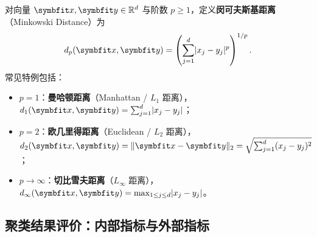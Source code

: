 \begin{definition}[闵可夫斯基距离及其常见特例]\label{def:minkowski-distance}
对向量 $\bm{x}, \bm{y}\in\R^d$ 与阶数 $p \ge 1$，定义\textbf{闵可夫斯基距离}（Minkowski Distance）为
\begin{equation}\label{eq:minkowski}
  d_p(\bm{x}, \bm{y}) = \left(\sum_{j=1}^{d}\abs{x_j - y_j}^p\right)^{1/p}.
\end{equation}
常见特例包括：
\begin{itemize}
  \item $p = 1$：\textbf{曼哈顿距离}（Manhattan / $L_1$ 距离），$d_1(\bm{x}, \bm{y}) = \sum_{j=1}^{d}\abs{x_j - y_j}$；
  \item $p = 2$：\textbf{欧几里得距离}（Euclidean / $L_2$ 距离），$d_2(\bm{x}, \bm{y}) = \norm{\bm{x} - \bm{y}}_2 = \sqrt{\sum_{j=1}^{d}(x_j - y_j)^2}$；
  \item $p \to \infty$：\textbf{切比雪夫距离}（$L_\infty$ 距离），$d_\infty(\bm{x}, \bm{y}) = \max_{1\le j\le d}\abs{x_j - y_j}$。
\end{itemize}
\end{definition}

\subsection{聚类结果评价：内部指标与外部指标}

